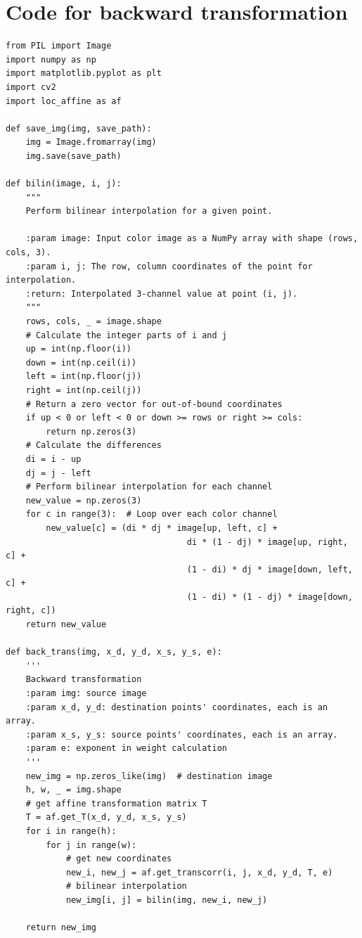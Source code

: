 \documentclass[UTF8]{ctexart}
\begin{document}
\hypertarget{code2}{\section{Code for backward transformation}}
\begin{lstlisting}
from PIL import Image
import numpy as np
import matplotlib.pyplot as plt
import cv2
import loc_affine as af

def save_img(img, save_path):
    img = Image.fromarray(img)
    img.save(save_path)

def bilin(image, i, j):
    """
    Perform bilinear interpolation for a given point.

    :param image: Input color image as a NumPy array with shape (rows, cols, 3).
    :param i, j: The row, column coordinates of the point for interpolation.
    :return: Interpolated 3-channel value at point (i, j).
    """
    rows, cols, _ = image.shape
    # Calculate the integer parts of i and j
    up = int(np.floor(i))
    down = int(np.ceil(i))
    left = int(np.floor(j))
    right = int(np.ceil(j))
    # Return a zero vector for out-of-bound coordinates
    if up < 0 or left < 0 or down >= rows or right >= cols:
        return np.zeros(3)
    # Calculate the differences
    di = i - up
    dj = j - left
    # Perform bilinear interpolation for each channel
    new_value = np.zeros(3)
    for c in range(3):  # Loop over each color channel
        new_value[c] = (di * dj * image[up, left, c] +
                                    di * (1 - dj) * image[up, right, c] +
                                    (1 - di) * dj * image[down, left, c] +
                                    (1 - di) * (1 - dj) * image[down, right, c])
    return new_value

def back_trans(img, x_d, y_d, x_s, y_s, e):
    '''
    Backward transformation
    :param img: source image
    :param x_d, y_d: destination points' coordinates, each is an array.
    :param x_s, y_s: source points' coordinates, each is an array.
    :param e: exponent in weight calculation
    '''
    new_img = np.zeros_like(img)  # destination image
    h, w, _ = img.shape
    # get affine transformation matrix T
    T = af.get_T(x_d, y_d, x_s, y_s)
    for i in range(h):
        for j in range(w):
            # get new coordinates
            new_i, new_j = af.get_transcorr(i, j, x_d, y_d, T, e)
            # bilinear interpolation
            new_img[i, j] = bilin(img, new_i, new_j)
    
    return new_img
\end{lstlisting}
\end{document}
